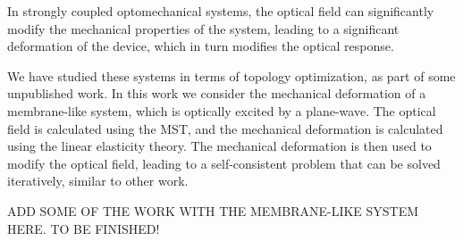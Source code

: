 In strongly coupled optomechanical systems, the optical field can significantly modify the mechanical properties of the system, leading to a significant deformation
of the device, which in turn modifies the optical response. 

We have studied these systems in terms of topology optimization, as part of some unpublished work. In this work we consider 
the mechanical deformation of a membrane-like system, which is optically excited by a plane-wave. The optical field is calculated using the MST,
and the mechanical deformation is calculated using the linear elasticity theory. The mechanical deformation is then used to modify the optical field, 
leading to a self-consistent problem that can be solved iteratively, similar to other work.

ADD SOME OF THE WORK WITH THE MEMBRANE-LIKE SYSTEM HERE. TO BE FINISHED!
